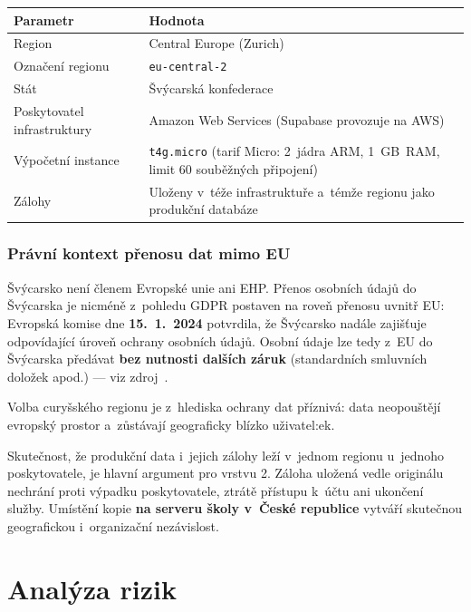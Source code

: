 \documentclass[11pt,a4paper]{article}
\begin{document}
\begin{center}
\begin{tabularx}{\textwidth}{@{}p{4.4cm}X@{}}
\toprule
\textbf{Parametr} & \textbf{Hodnota} \\
\midrule
Region & Central Europe (Zurich) \\
Označení regionu & \texttt{eu-central-2} \\
Stát & Švýcarská konfederace \\
Poskytovatel infrastruktury & Amazon Web Services (Supabase provozuje na AWS) \\
Výpočetní instance & \texttt{t4g.micro} (tarif Micro: 2~jádra ARM, 1~GB~RAM, limit 60 souběžných připojení) \\
Zálohy & Uloženy v~téže infrastruktuře a~témže regionu jako produkční databáze \\
\bottomrule
\end{tabularx}
\end{center}

\subsubsection*{Právní kontext přenosu dat mimo EU}

Švýcarsko není členem Evropské unie ani EHP. Přenos osobních údajů do Švýcarska je nicméně
z~pohledu GDPR postaven na roveň přenosu uvnitř EU: Evropská komise dne \textbf{15.~1.~2024}
potvrdila, že Švýcarsko nadále zajišťuje odpovídající úroveň ochrany osobních údajů. Osobní údaje
lze tedy z~EU do Švýcarska předávat \textbf{bez nutnosti dalších záruk} (standardních smluvních
doložek apod.) --- viz zdroj~\cite{adekvatnost}.

Volba curyšského regionu je z~hlediska ochrany dat příznivá: data neopouštějí evropský prostor
a~zůstávají geograficky blízko uživatel:ek.

\begin{informace}
Skutečnost, že produkční data i~jejich zálohy leží v~jednom regionu u~jednoho poskytovatele, je
hlavní argument pro vrstvu 2. Záloha uložená vedle originálu nechrání proti výpadku
poskytovatele, ztrátě přístupu k~účtu ani ukončení služby. Umístění kopie \textbf{na serveru
školy v~České republice} vytváří skutečnou geografickou i~organizační nezávislost.
\end{informace}

\newpage

\section{Analýza rizik}
\label{sec:rizika}
\end{document}
